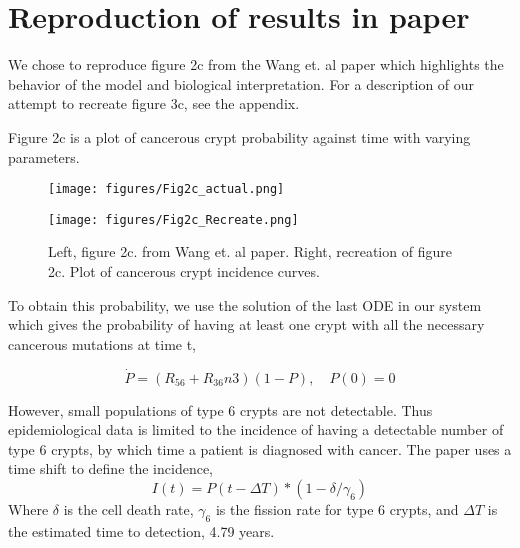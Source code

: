 \section{Reproduction of results in paper}

We chose to reproduce figure 2c from the Wang et. al paper which highlights the behavior of the model and biological interpretation. For a description of our attempt to recreate figure 3c, see the appendix.

Figure 2c is a plot of cancerous crypt probability against time with varying parameters. 
\begin{figure}[h]
    \centering
    \begin{minipage}{0.45\textwidth}
        \centering
        \texttt{[image: figures/Fig2c\_actual.png]}
    \end{minipage}
    \hfill
    \begin{minipage}{0.45\textwidth}
        \centering
        \texttt{[image: figures/Fig2c\_Recreate.png]}
    \end{minipage}
    \caption{Left, figure 2c. from Wang et. al paper. Right, recreation of figure 2c. Plot of cancerous crypt incidence curves.}
    \label{fig:side_by_side}
\end{figure}

\FloatBarrier
To obtain this probability, we use the solution of the last ODE in our system which gives the probability of having at least one crypt with all the necessary cancerous mutations at time t,

\begin{equation}
    \dot{P} = (R_{56}+R_{36}n3)(1-P), \quad P(0)=0
\end{equation}

However, small populations of type 6 crypts are not detectable. Thus epidemiological data is limited to the incidence of having a detectable number of type 6 crypts, by which time a patient is diagnosed with cancer. The paper uses a time shift to define the incidence,
\begin{equation}
    I(t) = P(t-\Delta T) * (1-\delta/\gamma_6)
\end{equation}
Where $\delta$ is the cell death rate, $\gamma_6$ is the fission rate for type 6 crypts, and  $\Delta T$ is the estimated time to detection, 4.79 years.

